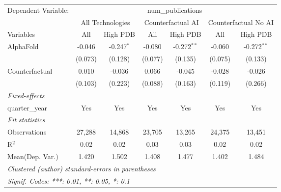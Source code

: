 \begingroup
\centering
\begin{tabular}{lcccccc}
   \tabularnewline \midrule \midrule
   Dependent Variable: & \multicolumn{6}{c}{num\_publications}\\
 & \multicolumn{2}{c}{All Technologies} & \multicolumn{2}{c}{Counterfactual AI} & \multicolumn{2}{c}{Counterfactual No AI} \\
\cmidrule(lr){1-1}\cmidrule(lr){2-3} \cmidrule(lr){4-5} \cmidrule(lr){6-7}
Variables & \multicolumn{1}{c}{All} & \multicolumn{1}{c}{High PDB} & \multicolumn{1}{c}{All} & \multicolumn{1}{c}{High PDB} & \multicolumn{1}{c}{All} & \multicolumn{1}{c}{High PDB} \\
\cmidrule(lr){1-1}\cmidrule(lr){2-2} \cmidrule(lr){3-3} \cmidrule(lr){4-4} \cmidrule(lr){5-5} \cmidrule(lr){6-6} \cmidrule(lr){7-7}
   AlphaFold      & -0.046  & -0.247$^{*}$ & -0.080  & -0.272$^{**}$ & -0.060  & -0.272$^{**}$\\   
                  & (0.073) & (0.128)      & (0.077) & (0.135)       & (0.075) & (0.133)\\   
   Counterfactual & 0.010   & -0.036       & 0.066   & -0.045        & -0.028  & -0.026\\   
                  & (0.103) & (0.223)      & (0.088) & (0.163)       & (0.119) & (0.266)\\   
   \midrule
   \emph{Fixed-effects}\\
   quarter\_year  & Yes     & Yes          & Yes     & Yes           & Yes     & Yes\\  
   \midrule
   \emph{Fit statistics}\\
   Observations   & 27,288  & 14,868       & 23,705  & 13,265        & 24,375  & 13,451\\  
   R$^2$          & 0.02    & 0.02         & 0.03    & 0.03          & 0.02    & 0.02\\  
Mean(Dep. Var.) & 1.420 & 1.502 & 1.408 & 1.477 & 1.402 & 1.484 \\
   \midrule \midrule
   \multicolumn{7}{l}{\emph{Clustered (author) standard-errors in parentheses}}\\
   \multicolumn{7}{l}{\emph{Signif. Codes: ***: 0.01, **: 0.05, *: 0.1}}\\
\end{tabular}
\par\endgroup
